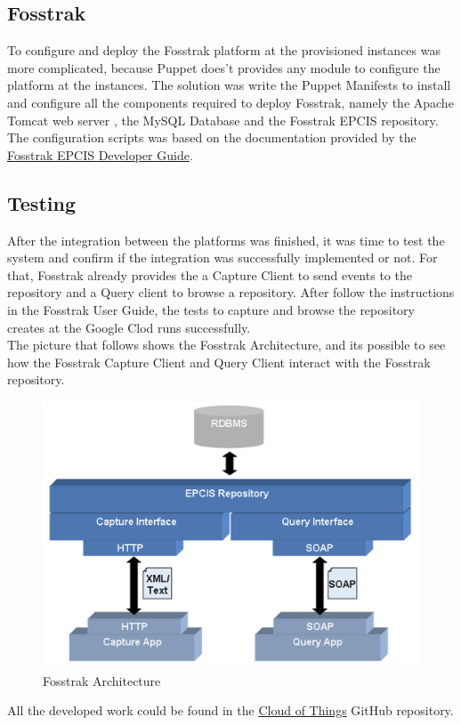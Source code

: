 \documentclass[12pt, twocolumn]{article}
\begin{document}
 \subsection{Fosstrak}
 To configure and deploy the Fosstrak platform at the provisioned instances was more complicated, because Puppet does't provides any module to configure the platform at the instances. The solution was write the Puppet Manifests to install and configure all the components required to deploy Fosstrak, namely the Apache Tomcat web server , the MySQL Database and the Fosstrak EPCIS repository. The configuration scripts was based on the documentation provided by the \href{https://code.google.com/p/fosstrak/wiki/EpcisDeveloperGuide}{Fosstrak EPCIS Developer Guide}.
 \subsection{Testing}
 After the integration between the platforms was finished, it was time to test the system and confirm if the integration was successfully implemented or not. For that, Fosstrak already provides the a Capture Client to send events to the repository and a Query 
 client to browse a repository. After follow the instructions in the Fosstrak User Guide, the tests to capture and browse the repository creates at the Google Clod runs successfully.\\
 The picture that follows shows the Fosstrak Architecture, and its possible to see how the Fosstrak Capture Client and Query Client interact with the Fosstrak repository.
 
 \begin{figure}[htb!] %
    \centering
    \includegraphics[width=.45\textwidth]{fosstrak} 
    \caption{Fosstrak Architecture}
    \label{fig:fosstrak}
 \end{figure} 	 
 
 All the developed work could be found in the \href{https://github.com/mvpgomes/cloud-of-things}{Cloud of Things} GitHub repository. 
\end{document}
